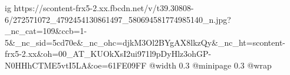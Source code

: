  
 
 
 
 

\ifcmt
  ig https://scontent-frx5-2.xx.fbcdn.net/v/t39.30808-6/272571072_4792454130861497_580694581774985140_n.jpg?_nc_cat=109&ccb=1-5&_nc_sid=5cd70e&_nc_ohc=djkM3Ol2BYgAX8lkzQy&_nc_ht=scontent-frx5-2.xx&oh=00_AT_KUOkXsI2ui971l9pDyHlz3ohGP-N0HHhCTME5vtI5LA&oe=61FE09FF
  @width 0.3
  @minipage 0.3
  @wrap \parpic[r]
\fi
